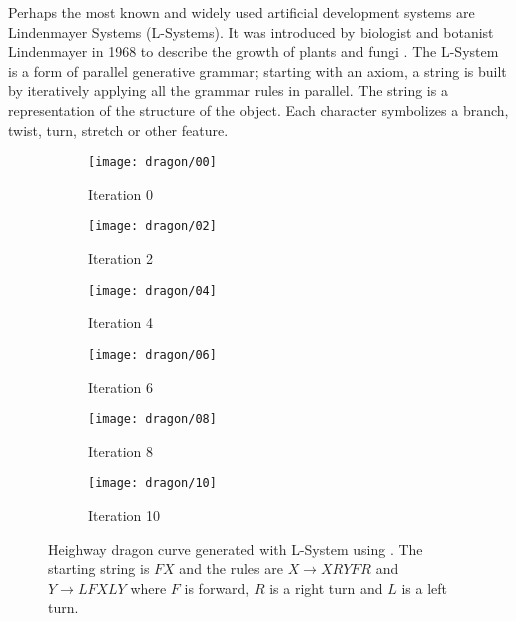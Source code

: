 Perhaps the most known and widely used artificial development systems are Lindenmayer Systems (L-Systems).
It was introduced by biologist and botanist Lindenmayer in 1968 to describe the growth of plants and fungi \cite{lindenmayer1968models}.
The L-System is a form of parallel generative grammar; starting with an axiom, a string is built by iteratively applying all the grammar rules in parallel.
The string is a representation of the structure of the object.
Each character symbolizes a branch, twist, turn, stretch or other feature.

\begin{figure}[!ht]
    \centering
    \begin{subfigure}{0.32\textwidth}
        \centering
        \texttt{[image: dragon/00]}
        \caption{Iteration 0}
    \end{subfigure}
    \begin{subfigure}{0.32\textwidth}
        \centering
        \texttt{[image: dragon/02]}
        \caption{Iteration 2}
    \end{subfigure}
    \begin{subfigure}{0.32\textwidth}
        \centering
        \texttt{[image: dragon/04]}
        \caption{Iteration 4}
    \end{subfigure}
    \par\bigskip
    \begin{subfigure}{0.32\textwidth}
        \centering
        \texttt{[image: dragon/06]}
        \caption{Iteration 6}
    \end{subfigure}
    \begin{subfigure}{0.32\textwidth}
        \centering
        \texttt{[image: dragon/08]}
        \caption{Iteration 8}
    \end{subfigure}
    \begin{subfigure}{0.32\textwidth}
        \centering
        \texttt{[image: dragon/10]}
        \caption{Iteration 10}
    \end{subfigure}
    \caption[Dragon curve]{
        Heighway dragon curve generated with L-System using \cite{lsystemgenerator}.
        The starting string is $FX$ and the rules are $X \rightarrow XRYFR$ and $Y \rightarrow LFXLY$ where $F$ is forward, $R$ is a right turn and $L$ is a left turn\footnotemark.
    }
    \label{fig:dragon-curve}
\end{figure}


